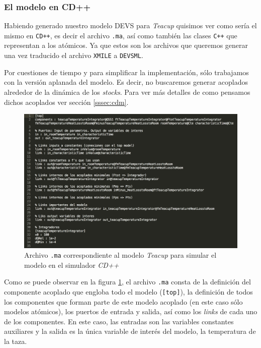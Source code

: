 \subsubsection{El modelo en CD++}
Habiendo generado nuestro modelo DEVS para \textit{Teacup} quisimos ver como sería el mismo en \texttt{CD++}, es decir el archivo \texttt{.ma}, así como también las clases  \texttt{C++} que representan a los atómicos. Ya que estos son los archivos que queremos generar una vez traducido el archivo \texttt{XMILE} a \texttt{DEVSML}.

Por cuestiones de tiempo y para simplificar la implementación, sólo trabajamos con la versión aplanada del modelo. Es decir, no buscaremos generar acoplados alrededor de la dinámica de los \textit{stocks}. Para ver más detalles de como pensamos dichos acoplados ver sección \ref{sssec:cdm}.

\begin{figure}[!h]
\centering
\includegraphics[scale=0.5]{imagenes/teacup_mapeo/Teacup_ma}
\caption{Archivo \texttt{.ma} correspondiente al modelo \textit{Teacup} para simular el modelo en el simulador \textit{CD++}}
\label{fig:Teacup_ma}
\end{figure}

Como se puede observar en la figura \ref{fig:Teacup_ma}, el archivo \texttt{.ma} consta de la definición del componente acoplado que engloba todo el modelo (\texttt{[top]}), la definición de todos los componentes que forman parte de este modelo acoplado (en este caso sólo modelos atómicos), los puertos de entrada y salida, así como los \textit{links} de cada uno de los componentes. En este caso, las entradas son las variables constantes auxiliares y la salida es la única variable de interés del modelo, la temperatura de la taza. 

